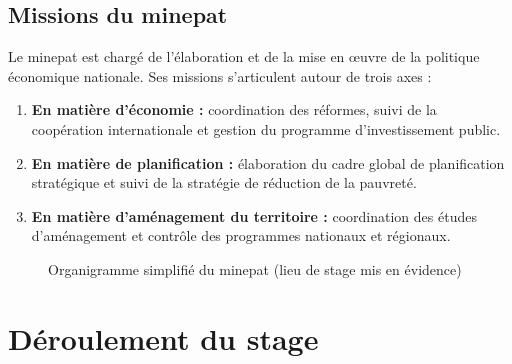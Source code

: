 \documentclass[12pt, a4paper, oneside]{report}
\begin{document}
\subsection{Missions du \gls{minepat}}

Le \gls{minepat} est chargé de l'élaboration et de la mise en œuvre de la politique économique nationale. Ses missions s'articulent autour de trois axes :

\begin{enumerate}
  \item \textbf{En matière d'économie :} coordination des réformes, suivi de la coopération internationale et gestion du programme d'investissement public.
  \item \textbf{En matière de planification :} élaboration du cadre global de planification stratégique et suivi de la stratégie de réduction de la pauvreté.
  \item \textbf{En matière d'aménagement du territoire :} coordination des études d'aménagement et contrôle des programmes nationaux et régionaux.
\end{enumerate}

\begin{figure}[H]
  \centering
  \caption{Organigramme simplifié du \gls{minepat} (lieu de stage mis en évidence)}
  \label{fig:organigramme}
\end{figure}

\section{Déroulement du stage}
\end{document}
